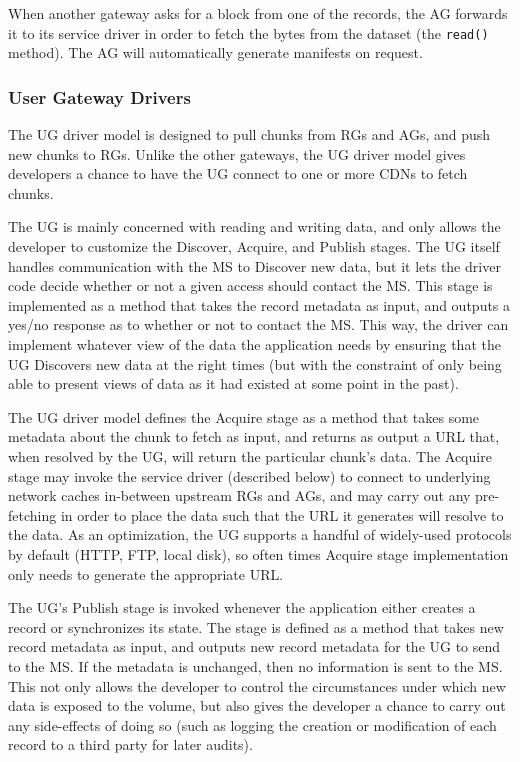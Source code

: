  When another gateway asks for a block from
one of the records, the AG forwards it to its service driver in order to fetch
the bytes from the dataset (the \texttt{read()} method).  The AG will
automatically generate manifests on request.

\subsubsection{User Gateway Drivers}

The UG driver model is designed to pull chunks from RGs and AGs, and push new
chunks to RGs.  Unlike the other gateways, the UG driver model gives developers
a chance to have the UG connect to one or more CDNs to fetch chunks.

  The UG is mainly concerned with reading
and writing data, and only allows the developer to customize the Discover, Acquire, and
Publish stages.  The UG itself handles communication with the MS to Discover new data,
but it lets the driver code decide whether or not a given access should contact
the MS.  This stage is implemented as a method that takes the record metadata as
input, and outputs a yes/no response as to whether or not to contact the MS.
This way, the driver can implement
whatever view of the data the application needs by ensuring that the UG
Discovers new data at the right times (but with the constraint of only being
able to present views of data as it had existed at some point in the past).

The UG driver model defines the Acquire stage as a method that takes some
metadata about the chunk to fetch as input, and returns as output a
URL that, when resolved by the UG, will return the particular chunk's data.
The Acquire stage may invoke the service driver (described below) to connect to
underlying network caches in-between upstream RGs and AGs, and may carry out any
pre-fetching in order to place the data such that the URL it generates will
resolve to the data.  As an optimization, the
UG supports a handful of widely-used protocols by default (HTTP, FTP, local
disk), so often times Acquire stage implementation only needs to
generate the appropriate URL.

The UG's Publish stage is invoked whenever the application either creates a
record or synchronizes its state.  The stage is defined as a
method that takes new record metadata as input, and outputs new record metadata for the UG to
send to the MS.  If the metadata is unchanged, then no information is sent to
the MS.  This not only allows the developer to control the circumstances under which
new data is exposed to the volume, but also gives the developer a chance to
carry out any side-effects of doing so (such as logging the creation or
modification of each record to a third party for later audits).

